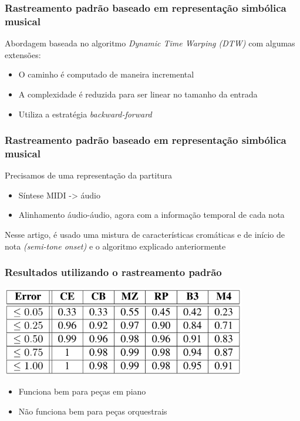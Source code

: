 \documentclass[serif,mathserif]{beamer}
\begin{document}
\begin{frame}
  \frametitle{Rastreamento padrão baseado em representação simbólica musical}
  Abordagem baseada no algoritmo \emph{Dynamic Time Warping (DTW)} com algumas extensões:\pause %
  \begin{itemize}
    \item O caminho é computado de maneira incremental\\\pause
    \item A complexidade é reduzida para ser linear no tamanho da entrada\pause
    \item Utiliza a estratégia \emph{backward-forward} %
  \end{itemize}
\end{frame}

\begin{frame}
  \frametitle{Rastreamento padrão baseado em representação simbólica musical}
  Precisamos de uma representação da partitura\pause
  \begin{itemize}
    \item Síntese MIDI -> áudio\\\pause
    \item Alinhamento áudio-áudio, agora com a informação temporal de cada nota\pause
  \end{itemize}
  Nesse artigo, é usado uma mistura de características cromáticas e de início de nota \emph{(semi-tone onset)} e o algoritmo explicado anteriormente
\end{frame}

\begin{frame}
  \frametitle{Resultados utilizando o rastreamento padrão}
  \begin{center}
    \includegraphics[width=0.8\textwidth]{src/img/1-Table2-1.png}
  \end{center}
  \pause
  \begin{itemize}
    \item Funciona bem para peças em piano\\\pause
    \item Não funciona bem para peças orquestrais
  \end{itemize}
\end{frame}
\end{document}
